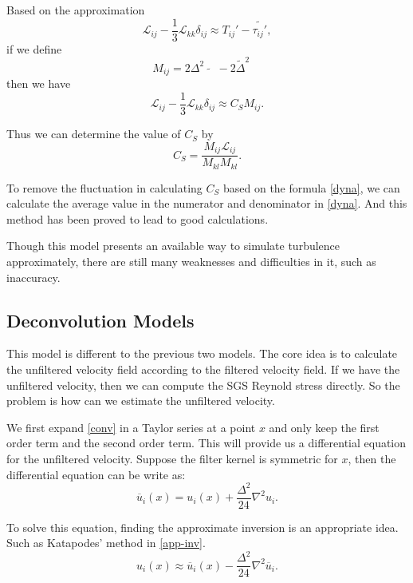 \documentclass[english, nochinese]{pkupaper}
\begin{document}
\par Based on the approximation
\begin{equation}
	\mathcal{L}_{ij} - \frac{1}{3}\mathcal{L}_{kk}\delta_{ij}\approx T_{ij}' - \widetilde{\tau_{ij}'},
\end{equation}
if we define
\begin{equation}
	M_{ij} = 2\Delta^2\widetilde{\mathop{\overline{S}}\mathop{\overline{S}_{ij}}} - 2\widetilde{\Delta}^2\mathop{\widetilde{\overline{S}}}\mathop{\widetilde{\overline{S}}_{ij}}
\end{equation}
then we have
\begin{equation}
	\mathcal{L}_{ij} - \frac{1}{3}\mathcal{L}_{kk}\delta_{ij} \approx C_S M_{ij}.
\end{equation}
\par Thus we can determine the value of $C_S$ by
\begin{equation}\label{dyna}
	C_S = \frac{M_{ij}\mathcal{L}_{ij}}{M_{kl}M_{kl}}.
\end{equation}
\par To remove the fluctuation in calculating $C_S$ based on the formula \eqref{dyna}, we can calculate the average value in the numerator and denominator in \eqref{dyna}. And this method has been proved to lead to good calculations.
\par Though this model presents an available way to simulate turbulence approximately, there are still many weaknesses and difficulties in it, such as inaccuracy.

\subsection{Deconvolution Models}
\par This model is different to the previous two models. The core idea is to calculate the unfiltered velocity field according to the filtered velocity field. If we have the unfiltered velocity, then we can compute the SGS Reynold stress directly. So the problem is how can we estimate the unfiltered velocity.
\par We first expand \eqref{conv} in a Taylor series at a point $x$ and only keep the first order term and the second order term. This will provide us a differential equation for the unfiltered velocity. Suppose the filter kernel is symmetric for $x$, then the differential equation can be write as:
\begin{equation}
	\overline{u}_i(x) = u_i(x) + \frac{\Delta^2}{24}\nabla^2u_i.
\end{equation}
\par To solve this equation, finding the approximate inversion is an appropriate idea. Such as Katapodes' method in \eqref{app-inv}.
\begin{equation}\label{app-inv}
	u_i(x)\approx \overline{u}_i(x) - \frac{\Delta^2}{24}\nabla^2\overline{u}_i.
\end{equation}
\end{document}
